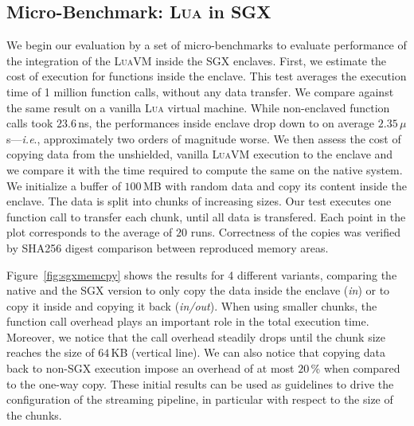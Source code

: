 \subsection{Micro-Benchmark: \textsc{Lua} in SGX}

We begin our evaluation by a set of micro-benchmarks to evaluate performance of the integration of the \textsc{LuaVM} inside the SGX enclaves.
First, we estimate the cost of execution for functions inside the enclave.
This test averages the execution time of 1 million function calls, without any data transfer.
We compare against the same result on a vanilla \textsc{Lua} virtual machine.
While non-enclaved function calls took $23.6$\,ns, the performances inside enclave drop down to on average $2.35$\,$\mu$s---\textit{i.e}., approximately two orders of magnitude worse.
We then assess the cost of copying data from the unshielded, vanilla \textsc{LuaVM} execution to the enclave and we compare it with the time required to compute the same on the native system.
We initialize a buffer of $100$\,MB with random data and copy its content inside the enclave.
The data is split into chunks of increasing sizes.
Our test executes one function call to transfer each chunk, until all data is transfered.
Each point in the plot corresponds to the average of $20$ runs.
Correctness of the copies was verified by \textsf{SHA256} digest comparison between reproduced memory areas.

Figure~\ref{fig:sgxmemcpy} shows the results for 4 different variants, comparing the native and the SGX version to only copy the data inside the enclave (\emph{in}) or to copy it inside and copying it back (\emph{in/out}).
When using smaller chunks, the function call overhead plays an important role in the total execution time.
Moreover, we notice that the call overhead steadily drops until the chunk size reaches the size of $64$\,KB (vertical line).
We can also notice that copying data back to non-SGX execution impose an overhead of at most $20$\,\% when compared to the one-way copy.
These initial results can be used as guidelines to drive the configuration of the streaming pipeline, in particular with respect to the size of the chunks. %

